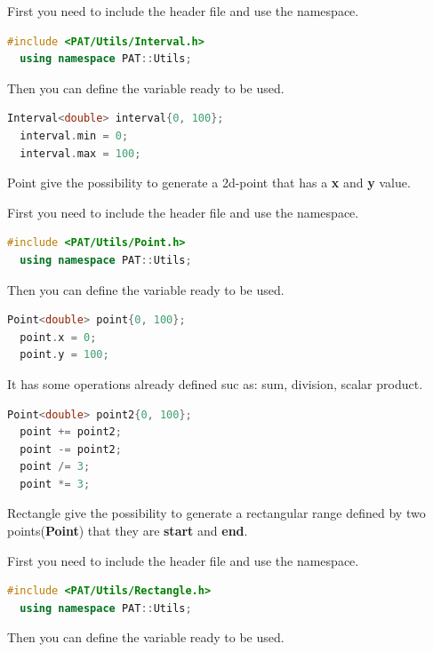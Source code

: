 First you need to include the header file and use the namespace.

\begin{lstlisting}[language=c++, gobble=2]
  #include <PAT/Utils/Interval.h>
  using namespace PAT::Utils;
\end{lstlisting}

Then you can define the variable ready to be used.

\begin{lstlisting}[language=c++, gobble=2]
  Interval<double> interval{0, 100};
  interval.min = 0;
  interval.max = 100;
\end{lstlisting}


Point give the possibility to generate a 2d-point that has a
\textbf{x} and \textbf{y} value.

First you need to include the header file and use the namespace.

\begin{lstlisting}[language=c++, gobble=2]
  #include <PAT/Utils/Point.h>
  using namespace PAT::Utils;
\end{lstlisting}

Then you can define the variable ready to be used.

\begin{lstlisting}[language=c++, gobble=2]
  Point<double> point{0, 100};
  point.x = 0;
  point.y = 100;  
\end{lstlisting}

It has some operations already defined suc as: sum, division, scalar
product.

\begin{lstlisting}[language=c++, gobble=2]
  Point<double> point2{0, 100};
  point += point2;
  point -= point2;
  point /= 3;
  point *= 3;  
\end{lstlisting}


Rectangle give the possibility to generate a rectangular range defined
by two points(\textbf{Point}) that they are \textbf{start} and
\textbf{end}.

First you need to include the header file and use the namespace.

\begin{lstlisting}[language=c++, gobble=2]
  #include <PAT/Utils/Rectangle.h>
  using namespace PAT::Utils;
\end{lstlisting}

Then you can define the variable ready to be used.

